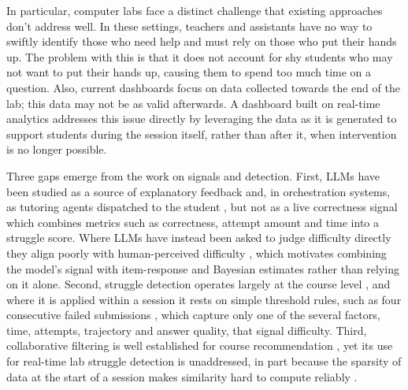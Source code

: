 In particular, computer labs face a distinct challenge that existing approaches don't address well. In these settings, teachers and assistants have no way to swiftly identify those who need help and must rely on those who put their hands up. The problem with this is that it does not account for shy students who may not want to put their hands up, causing them to spend too much time on a question. Also, current dashboards focus on data collected towards the end of the lab; this data may not be as valid afterwards. 
A dashboard built on real-time analytics addresses this issue directly by leveraging the data as it is generated to support students during the session itself, rather than after it, when intervention is no longer possible.

Three gaps emerge from the work on signals and detection. 
First, LLMs have been studied as a source of explanatory feedback \cite{koutcheme_using, pitts_a} and, in orchestration systems, as tutoring agents dispatched to the student \cite{zhangClassAidRealtimeInstructorAIStudent2026}, but not as a live correctness signal which combines metrics such as correctness, attempt amount and time into a struggle score. 
Where LLMs have instead been asked to judge difficulty directly they align poorly with human-perceived difficulty \cite{liCanLLMsEstimate2025, tabibTrustworthyDifficultyAssessments2025}, which motivates combining the model's signal with item-response and Bayesian estimates rather than relying on it alone.
Second, struggle detection operates largely at the course level \cite{estey_2017_automatically}, and where it is applied within a session it rests on simple threshold rules, such as four consecutive failed submissions \cite{dong_using}, which capture only one of the several factors, time, attempts, trajectory and answer quality, that signal difficulty. 
Third, collaborative filtering is well established for course recommendation \cite{li_2020_course, schafer_2007_collaborative}, yet its use for real-time lab struggle detection is unaddressed, in part because the sparsity of data at the start of a session makes similarity hard to compute reliably \cite{herlockerAlgorithmicFrameworkPerforming1999}.

